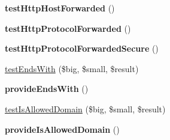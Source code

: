 \begin{DoxyCompactItemize}
\item 
\hypertarget{classPHPSDKTestCase_ac636302133175c5a9de8251eff315012}{{\bfseries test\-Http\-Host\-Forwarded} ()}\label{classPHPSDKTestCase_ac636302133175c5a9de8251eff315012}

\item 
\hypertarget{classPHPSDKTestCase_a7bcd75da794dc51a648c98d31e3aa720}{{\bfseries test\-Http\-Protocol\-Forwarded} ()}\label{classPHPSDKTestCase_a7bcd75da794dc51a648c98d31e3aa720}

\item 
\hypertarget{classPHPSDKTestCase_a26309b9367d7744c185f81f669676b42}{{\bfseries test\-Http\-Protocol\-Forwarded\-Secure} ()}\label{classPHPSDKTestCase_a26309b9367d7744c185f81f669676b42}

\item 
\hyperlink{classPHPSDKTestCase_a0d37a6b1b0f3808619cb56ff51d6c034}{test\-Ends\-With} (\$big, \$small, \$result)
\item 
\hypertarget{classPHPSDKTestCase_a3f9755abfaeb22e5a178209b15d5e842}{{\bfseries provide\-Ends\-With} ()}\label{classPHPSDKTestCase_a3f9755abfaeb22e5a178209b15d5e842}

\item 
\hyperlink{classPHPSDKTestCase_aff74ded41540e5ec4a32e7656acbe928}{test\-Is\-Allowed\-Domain} (\$big, \$small, \$result)
\item 
\hypertarget{classPHPSDKTestCase_a52d73196c325cd233320d3e75dad22fa}{{\bfseries provide\-Is\-Allowed\-Domain} ()}\label{classPHPSDKTestCase_a52d73196c325cd233320d3e75dad22fa}

\end{DoxyCompactItemize}
